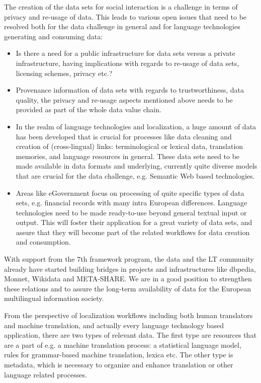 \documentclass[10pt, plain]{../../metanetpaper}
\begin{document}
\begin{multicols}{2}
The creation of the data sets for social interaction is a challenge in terms of privacy and re-usage of data. This leads to various open issues that need to be resolved both for the data challenge in general and for language technologies generating and consuming data:

\begin{itemize}
\item Is there a need for a public infrastructure for data sets versus a private infrastructure, having implications with regards to re-usage of data sets, licensing schemes, privacy etc.?
\item Provenance information of data sets with regards to trustworthiness, data quality, the privacy and re-usage aspects mentioned above needs to be provided as part of the whole data value chain.
\item In the realm of language technologies and localization, a huge amount of data has been developed that is crucial for processes like data cleaning and creation of (cross-lingual) links: terminological or lexical data, translation memories, and language resources in general. These data sets need to be made available in data formats and underlying, currently quite diverse models that are crucial for the data challenge, e.g. Semantic Web based technologies.
\item Areas like eGovernment focus on processing of quite specific types of data sets, e.g. financial records with many intra European differences. Language technologies need to be made ready-to-use beyond general textual input or output. This will foster their application for a great variety of data sets, and assure that they will become part of the related workflows for data creation and consumption.
\end{itemize}

With support from the 7th framework program, the data and the LT community already have started building bridges in projects and infrastructures like dbpedia, Monnet, Wikidata and META-SHARE. We are in a good position to strengthen these relations and to assure the long-term availability of data for the European multilingual information society.


From the perspective of localization workflows including both human translators and machine translation, and actually every language technology based application, there are two types of relevant data. The first type are resources that are a part of e.g. a machine translation process: a statistical language model, rules for grammar-based machine translation, lexica etc. The other type is metadata, which is necessary to organize and enhance translation or other language related processes.


\end{multicols}
\end{document}
